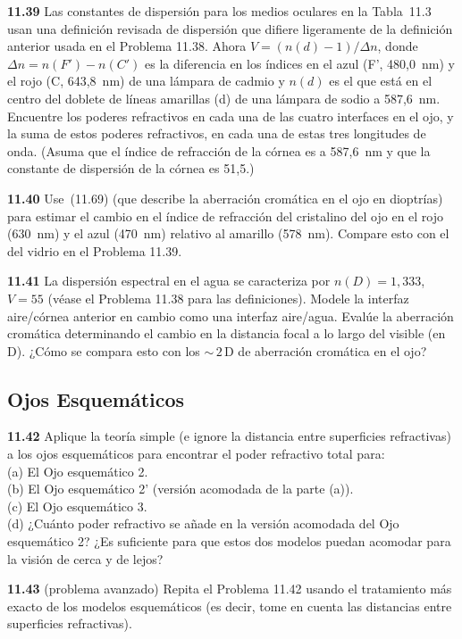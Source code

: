 \documentclass[12pt]{book}
\begin{document}
\textbf{11.39} Las constantes de dispersión para los medios oculares en la Tabla~11.3 usan una definición revisada de dispersión que difiere ligeramente de la definición anterior usada en el Problema 11.38. Ahora $V = (n(d)-1)/\Delta n$, donde $\Delta n = n(F') - n(C')$ es la diferencia en los índices en el azul (F', 480,0~nm) y el rojo (C, 643,8~nm) de una lámpara de cadmio y $n(d)$ es el que está en el centro del doblete de líneas amarillas (d) de una lámpara de sodio a 587,6~nm. Encuentre los poderes refractivos en cada una de las cuatro interfaces en el ojo, y la suma de estos poderes refractivos, en cada una de estas tres longitudes de onda. (Asuma que el índice de refracción de la córnea es a 587,6~nm y que la constante de dispersión de la córnea es 51,5.)

\textbf{11.40} Use~(11.69) (que describe la aberración cromática en el ojo en dioptrías) para estimar el cambio en el índice de refracción del cristalino del ojo en el rojo (630~nm) y el azul (470~nm) relativo al amarillo (578~nm). Compare esto con el del vidrio en el Problema 11.39.

\textbf{11.41} La dispersión espectral en el agua se caracteriza por $n(D) = 1{,}333$, $V = 55$ (véase el Problema 11.38 para las definiciones). Modele la interfaz aire/córnea anterior en cambio como una interfaz aire/agua. Evalúe la aberración cromática determinando el cambio en la distancia focal a lo largo del visible (en D). ¿Cómo se compara esto con los ${\sim}\,2\,\text{D}$ de aberración cromática en el ojo?

\subsection*{Ojos Esquemáticos}

\textbf{11.42} Aplique la teoría simple (e ignore la distancia entre superficies refractivas) a los ojos esquemáticos para encontrar el poder refractivo total para:\\
(a) El Ojo esquemático 2.\\
(b) El Ojo esquemático 2' (versión acomodada de la parte (a)).\\
(c) El Ojo esquemático 3.\\
(d) ¿Cuánto poder refractivo se añade en la versión acomodada del Ojo esquemático 2? ¿Es suficiente para que estos dos modelos puedan acomodar para la visión de cerca y de lejos?

\textbf{11.43} (problema avanzado) Repita el Problema 11.42 usando el tratamiento más exacto de los modelos esquemáticos (es decir, tome en cuenta las distancias entre superficies refractivas).
\end{document}
